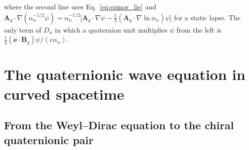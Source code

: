 \documentclass[aps,prd,onecolumn,tightenlines,nofootinbib,notitlepage,11pt,floatfix]{revtex4-2}
\theoremstyle{indentedtheorem}
\begin{document}
where the second line uses Eq.~\eqref{eq:spinor_lie} and $\mathbf{A}_g\cdot\nabla(\alpha_n^{-1/2}\psi) = \alpha_n^{-1/2}\big[\mathbf{A}_g\cdot\nabla\psi - \tfrac{1}{2}(\mathbf{A}_g\cdot\nabla\ln\alpha_n)\psi\big]$ for a static lapse. The only term of $D_n$ in which a quaternion unit multiplies $\psi$ from the left is $\tfrac{1}{4}(\mathbf{e}\cdot\mathbf{B}_g)\psi/(c\alpha_n)$.

\section{The quaternionic wave equation in curved spacetime}
\label{sec:wave_equation}

\subsection{From the Weyl--Dirac equation to the chiral quaternionic pair}
\label{sec:weyl_pair_derivation}
\end{document}
